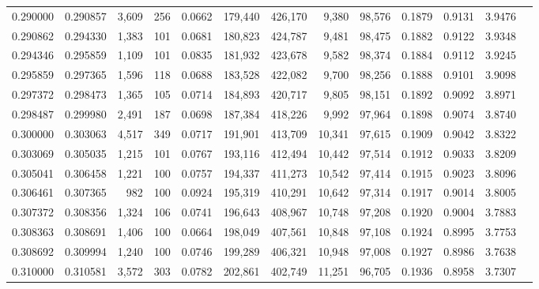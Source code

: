 \begin{tabular}{rrrrrrrrrrrrr}
0.290000 & 0.290857 & 3,609 & 256 &                                     0.0662 & 179,440 & 426,170 &   9,380 &  98,576 & 0.1879 & 0.9131 & 3.9476 \\
0.290862 & 0.294330 & 1,383 & 101 &                                     0.0681 & 180,823 & 424,787 &   9,481 &  98,475 & 0.1882 & 0.9122 & 3.9348 \\
0.294346 & 0.295859 & 1,109 & 101 &                                     0.0835 & 181,932 & 423,678 &   9,582 &  98,374 & 0.1884 & 0.9112 & 3.9245 \\
0.295859 & 0.297365 & 1,596 & 118 &                                     0.0688 & 183,528 & 422,082 &   9,700 &  98,256 & 0.1888 & 0.9101 & 3.9098 \\
0.297372 & 0.298473 & 1,365 & 105 &                                     0.0714 & 184,893 & 420,717 &   9,805 &  98,151 & 0.1892 & 0.9092 & 3.8971 \\
0.298487 & 0.299980 & 2,491 & 187 &                                     0.0698 & 187,384 & 418,226 &   9,992 &  97,964 & 0.1898 & 0.9074 & 3.8740 \\
0.300000 & 0.303063 & 4,517 & 349 &                                     0.0717 & 191,901 & 413,709 &  10,341 &  97,615 & 0.1909 & 0.9042 & 3.8322 \\
0.303069 & 0.305035 & 1,215 & 101 &                                     0.0767 & 193,116 & 412,494 &  10,442 &  97,514 & 0.1912 & 0.9033 & 3.8209 \\
0.305041 & 0.306458 & 1,221 & 100 &                                     0.0757 & 194,337 & 411,273 &  10,542 &  97,414 & 0.1915 & 0.9023 & 3.8096 \\
0.306461 & 0.307365 &   982 & 100 &                                     0.0924 & 195,319 & 410,291 &  10,642 &  97,314 & 0.1917 & 0.9014 & 3.8005 \\
0.307372 & 0.308356 & 1,324 & 106 &                                     0.0741 & 196,643 & 408,967 &  10,748 &  97,208 & 0.1920 & 0.9004 & 3.7883 \\
0.308363 & 0.308691 & 1,406 & 100 &                                     0.0664 & 198,049 & 407,561 &  10,848 &  97,108 & 0.1924 & 0.8995 & 3.7753 \\
0.308692 & 0.309994 & 1,240 & 100 &                                     0.0746 & 199,289 & 406,321 &  10,948 &  97,008 & 0.1927 & 0.8986 & 3.7638 \\
0.310000 & 0.310581 & 3,572 & 303 &                                     0.0782 & 202,861 & 402,749 &  11,251 &  96,705 & 0.1936 & 0.8958 & 3.7307 \\

\end{tabular}
